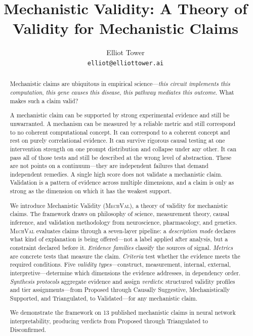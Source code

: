 \documentclass{article}
\title{Mechanistic Validity: A Theory of Validity for Mechanistic Claims}
\author{
Elliot Tower \\
\texttt{elliot@elliottower.ai}
}
\newcommand{\mechval}{\textsc{MechVal}}
\begin{document}
\maketitle

\begin{abstract}
Mechanistic claims are ubiquitous in empirical science---\emph{this circuit implements this computation}, \emph{this gene causes this disease}, \emph{this pathway mediates this outcome}. What makes such a claim valid?

A mechanistic claim can be supported by strong experimental evidence and still be unwarranted. A mechanism can be measured by a reliable metric and still correspond to no coherent computational concept. It can correspond to a coherent concept and rest on purely correlational evidence. It can survive rigorous causal testing at one intervention strength on one prompt distribution and collapse under any other. It can pass all of those tests and still be described at the wrong level of abstraction. These are not points on a continuum---they are independent failures that demand independent remedies. A single high score does not validate a mechanistic claim. Validation is a pattern of evidence across multiple dimensions, and a claim is only as strong as the dimension on which it has the weakest support.

We introduce Mechanistic Validity (\mechval{}), a theory of validity for mechanistic claims. The framework draws on philosophy of science, measurement theory, causal inference, and validation methodology from neuroscience, pharmacology, and genetics. \mechval{} evaluates claims through a seven-layer pipeline: a \emph{description mode} declares what kind of explanation is being offered---not a label applied after analysis, but a constraint declared before it. \emph{Evidence families} classify the sources of signal. \emph{Metrics} are concrete tests that measure the claim. \emph{Criteria} test whether the evidence meets the required conditions. Five \emph{validity types}---construct, measurement, internal, external, interpretive---determine which dimensions the evidence addresses, in dependency order. \emph{Synthesis protocols} aggregate evidence and assign \emph{verdicts}: structured validity profiles and tier assignments---from Proposed through Causally Suggestive, Mechanistically Supported, and Triangulated, to Validated---for any mechanistic claim.

We demonstrate the framework on 13 published mechanistic claims in neural network interpretability, producing verdicts from Proposed through Triangulated to Disconfirmed.
\end{abstract}
\end{document}
